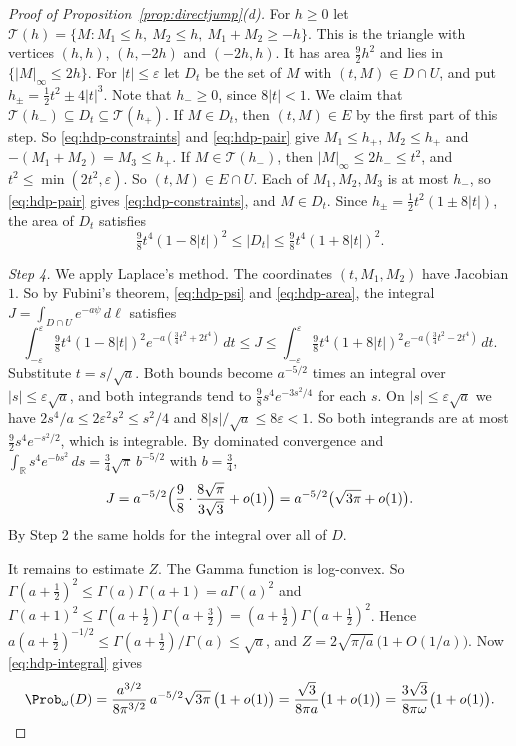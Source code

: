 \begin{proof}[Proof of Proposition~\ref{prop:directjump}\textup{(d)}]
For $h\ge0$ let
$\mathcal T(h)=\{M:M_1\le h,\ M_2\le h,\ M_1+M_2\ge-h\}$. This is the
triangle with vertices $(h,h)$, $(h,-2h)$ and $(-2h,h)$. It has area
$\frac92h^2$ and lies in $\{\lvert M\rvert_\infty\le2h\}$. For
$\lvert t\rvert\le\varepsilon$ let $D_t$ be the set of $M$ with
$(t,M)\in D\cap U$, and put $h_\pm=\frac12t^2\pm4\lvert t\rvert^3$. Note that
$h_-\ge0$, since $8\lvert t\rvert<1$. We claim that
$\mathcal T(h_-)\subseteq D_t\subseteq\mathcal T(h_+)$. If $M\in D_t$, then
$(t,M)\in E$ by the first part of this step. So \eqref{eq:hdp-constraints}
and \eqref{eq:hdp-pair} give $M_1\le h_+$, $M_2\le h_+$ and
$-(M_1+M_2)=M_3\le h_+$. If $M\in\mathcal T(h_-)$, then
$\lvert M\rvert_\infty\le2h_-\le t^2$, and $t^2\le\min(2t^2,\varepsilon)$.
So $(t,M)\in E\cap U$. Each of $M_1,M_2,M_3$ is at most $h_-$, so
\eqref{eq:hdp-pair} gives \eqref{eq:hdp-constraints}, and $M\in D_t$. Since
$h_\pm=\frac12t^2(1\pm8\lvert t\rvert)$, the area of $D_t$ satisfies
\begin{equation}\label{eq:hdp-area}
 \tfrac98t^4(1-8\lvert t\rvert)^2\le\lvert D_t\rvert
 \le\tfrac98t^4(1+8\lvert t\rvert)^2 .
\end{equation}

\emph{Step 4.} We apply Laplace's method. The coordinates $(t,M_1,M_2)$ have
Jacobian $1$. So by Fubini's theorem, \eqref{eq:hdp-psi} and
\eqref{eq:hdp-area}, the integral $J=\int_{D\cap U}e^{-a\psi}\,d\ell$
satisfies
\[
 \int_{-\varepsilon}^{\varepsilon}\tfrac98t^4(1-8\lvert t\rvert)^2
 e^{-a(\frac34t^2+2t^4)}\,dt
 \le J\le
 \int_{-\varepsilon}^{\varepsilon}\tfrac98t^4(1+8\lvert t\rvert)^2
 e^{-a(\frac34t^2-2t^4)}\,dt .
\]
Substitute $t=s/\sqrt a$. Both bounds become $a^{-5/2}$ times an integral
over $\lvert s\rvert\le\varepsilon\sqrt a$, and both integrands tend to
$\frac98s^4e^{-3s^2/4}$ for each $s$. On $\lvert s\rvert\le\varepsilon\sqrt a$
we have $2s^4/a\le2\varepsilon^2s^2\le s^2/4$ and
$8\lvert s\rvert/\sqrt a\le8\varepsilon<1$. So both integrands are at most
$\frac92s^4e^{-s^2/2}$, which is integrable. By dominated convergence and
$\int_{\mathbb R}s^4e^{-bs^2}\,ds=\frac34\sqrt\pi\,b^{-5/2}$ with
$b=\frac34$,
\[
 J=a^{-5/2}\Bigl(\frac98\cdot\frac{8\sqrt\pi}{3\sqrt3}+o(1)\Bigr)
 =a^{-5/2}\bigl(\sqrt{3\pi}+o(1)\bigr).
\]
By Step 2 the same holds for the integral over all of $D$.

It remains to estimate $Z$. The Gamma function is log-convex. So
$\Gamma(a+\frac12)^2\le\Gamma(a)\Gamma(a+1)=a\Gamma(a)^2$ and
$\Gamma(a+1)^2\le\Gamma(a+\frac12)\Gamma(a+\frac32)
=(a+\frac12)\Gamma(a+\frac12)^2$. Hence
$a(a+\frac12)^{-1/2}\le\Gamma(a+\frac12)/\Gamma(a)\le\sqrt a$, and
$Z=2\sqrt{\pi/a}\,\bigl(1+O(1/a)\bigr)$. Now \eqref{eq:hdp-integral} gives
\[
 \Prob_\omega(D)=\frac{a^{3/2}}{8\pi^{3/2}}\,a^{-5/2}\sqrt{3\pi}\,\bigl(1+o(1)\bigr)
 =\frac{\sqrt3}{8\pi a}\bigl(1+o(1)\bigr)
 =\frac{3\sqrt3}{8\pi\omega}\bigl(1+o(1)\bigr). \qedhere
\]
\end{proof}
